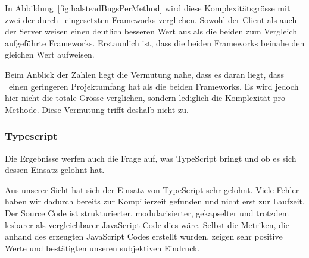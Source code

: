 		In Abbildung\ \ref{fig:halsteadBugsPerMethod} wird diese Komplexitätsgrösse mit zwei der durch \eeppi\ eingesetzten Frameworks verglichen.
		Sowohl der Client als auch der Server weisen einen deutlich besseren Wert aus als die beiden zum Vergleich aufgeführte Frameworks.
		Erstaunlich ist, dass die beiden Frameworks beinahe den gleichen Wert aufweisen.
		
		Beim Anblick der Zahlen liegt die Vermutung nahe, dass es daran liegt,
		dass \eeppi\ einen geringeren Projektumfang hat als die beiden Frameworks.
		Es wird jedoch hier nicht die totale Grösse verglichen, sondern lediglich die Komplexität pro Methode.
		Diese Vermutung trifft deshalb nicht zu.
				
				
	\subsubsection{Typescript}
	Die Ergebnisse werfen auch die Frage auf, was TypeScript bringt und ob es sich dessen Einsatz gelohnt hat.
	
	Aus unserer Sicht hat sich der Einsatz von TypeScript sehr gelohnt. 
	Viele Fehler haben wir dadurch bereits zur Kompilierzeit gefunden und nicht erst zur Laufzeit.
	Der Source Code ist strukturierter, modularisierter, gekapselter und trotzdem lesbarer als vergleichbarer JavaScript Code dies wäre.
	Selbst die Metriken, die anhand des erzeugten JavaScript Codes erstellt wurden, zeigen sehr positive Werte und bestätigten unseren subjektiven Eindruck.	
	
